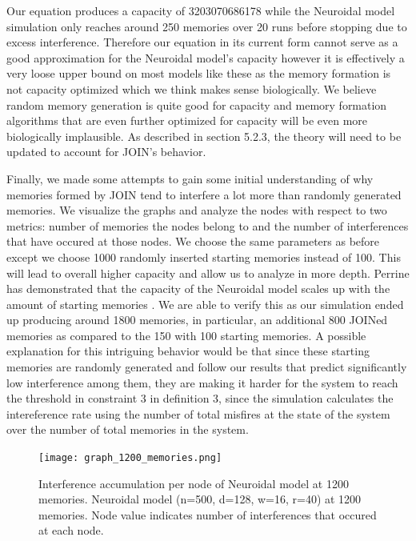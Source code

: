 Our equation produces a capacity of 3203070686178 while the Neuroidal model simulation only reaches around 250 memories over 20 runs before stopping due to excess interference. Therefore our equation in its current form cannot serve as a good approximation for the Neuroidal model's capacity however it is effectively a very loose upper bound on most models like these as the memory formation is not capacity optimized which we think makes sense biologically. We believe random memory generation is quite good for capacity and memory formation algorithms that are even further optimized for capacity will be even more biologically implausible. As described in section 5.2.3, the theory will need to be updated to account for JOIN's behavior. 

Finally, we made some attempts to gain some initial understanding of why memories formed by JOIN tend to interfere a lot more than randomly generated memories. We visualize the graphs and analyze the nodes with respect to two metrics: number of memories the nodes belong to and the number of interferences that have occured at those nodes. We choose the same parameters as before except we choose 1000 randomly inserted starting memories instead of 100. This will lead to overall higher capacity and allow us to analyze in more depth. Perrine has demonstrated that the capacity of the Neuroidal model scales up with the amount of starting memories \cite{perrine2023neural}. We are able to verify this as our simulation ended up producing around 1800 memories, in particular, an additional 800 JOINed memories as compared to the 150 with 100 starting memories. A possible explanation for this intriguing behavior would be that since these starting memories are randomly generated and follow our results that predict significantly low interference among them, they are making it harder for the system to reach the threshold in constraint 3 in definition 3, since the simulation calculates the intereference rate using the number of total misfires at the state of the system over the number of total memories in the system.

\begin{figure}%
    \centering
    \texttt{[image: graph\_1200\_memories.png]}
    \caption[Interference accumulation per node of Neuroidal model at 1200 memories]{Interference accumulation per node of Neuroidal model at 1200 memories. \textmd{Neuroidal model (n=500, d=128, w=16, r=40) at 1200 memories. Node value indicates number of interferences that occured at each node.}}
    \label{fig:sub1}
\end{figure}

